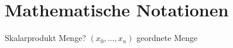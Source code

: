 \chapter*{Mathematische Notationen}
\label{mathematische_notationen}

Skalarprodukt
Menge?
$\left(x_0, \ldots, x_n\right)$ geordnete Menge
